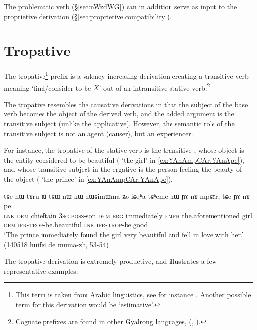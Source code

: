 The problematic verb    (§\ref{sec:nWzdWG}) can in addition serve as input to the proprietive derivation (§\ref{sec:proprietive.compatibility}).

\section{Tropative} \label{sec:tropative}
The tropative\footnote{This term is taken from Arabic linguistics, see for instance \citet{larcher96}. Another possible term for this derivation would be `estimative'. }  prefix is a valency-increasing derivation creating a transitive verb meaning `find/consider to be $X$' out of an intransitive stative verb.\footnote{Cognate prefixes are found in other Gyalrong languages, (\citealt[5--6]{jackson06paisheng}, \citealt{jacques13tropative}).} 
 
The tropative resembles the causative derivations in that the subject of the base verb becomes the object of the derived verb, and the added argument is the transitive subject (unlike the applicative). However, the semantic role of the transitive subject is not an agent (causer), but an experiencer.

For instance, the tropative of the stative verb  is the transitive , whose object is the entity considered to be beautiful ( `the girl' in \ref{ex:YAnAmpCAr.YAnApe}), and whose transitive subject in the ergative is the person feeling the beauty of the object ( `the prince' in \ref{ex:YAnAmpCAr.YAnApe}).

\begin{exe}
\ex \label{ex:YAnAmpCAr.YAnApe}
\gll tɕe nɯ tɤru ɯ-tɕɯ nɯ kɯ nɯɕimɯma ʑo iɕqʰa tɕʰeme nɯ ɲɤ-nɤ-mpɕɤr,
tɕe ɲɤ-nɤ-pe. \\
\textsc{lnk} \textsc{dem} chieftain \textsc{3sg}.\textsc{poss}-son \textsc{dem} \textsc{erg} immediately \textsc{emph} the.aforementioned girl \textsc{dem} \textsc{ifr}-\textsc{trop}-be.beautiful \textsc{lnk} \textsc{ifr}-\textsc{trop}-be.good \\
\glt `The prince immediately found the girl very beautiful and fell in love with her.' (140518 huifei de muma-zh, 53-54)
\end{exe}

The tropative derivation is extremely productive, and  illustrates a few representative examples.

